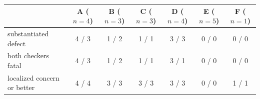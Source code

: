 \begin{tabular}{@{}lcccccc@{}}
\toprule
 & A ($n{=}4$) & B ($n{=}3$) & C ($n{=}3$) & D ($n{=}4$) & E ($n{=}5$) & F ($n{=}1$) \\
\midrule
substantiated defect & 4 / 3 & 1 / 2 & 1 / 1 & 3 / 3 & 0 / 0 & 0 / 0 \\
\quad both checkers fatal & 4 / 3 & 1 / 2 & 1 / 1 & 3 / 1 & 0 / 0 & 0 / 0 \\
localized concern or better & 4 / 4 & 3 / 3 & 3 / 3 & 3 / 3 & 0 / 0 & 1 / 1 \\
\bottomrule
\end{tabular}
